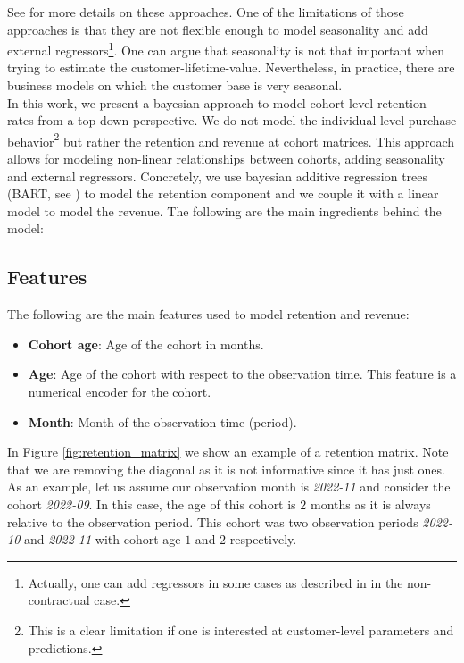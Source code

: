 \documentclass[11pt]{amsart}
\theoremstyle{definition}
\begin{document}
See \cite{FaderHardieNote2017} for more details on these approaches. One of the
limitations of those approaches is that they are not flexible enough to model
seasonality and add external regressors\footnote{Actually, one can add regressors in
some cases as described in \cite{FaderHardieNote2007} in the non-contractual case.}.
One can argue that seasonality is not that important when trying to estimate the
customer-lifetime-value. Nevertheless, in practice, there are business models on which
the customer base is very seasonal. \\

In this work, we present a bayesian approach to model cohort-level retention rates from
a top-down perspective. We do not model the individual-level purchase
behavior\footnote{This is a clear limitation if one is interested at customer-level
parameters and predictions.} but rather the retention and revenue at cohort matrices.
This approach allows for modeling non-linear relationships between cohorts, adding
seasonality and external regressors. Concretely, we use bayesian additive regression
trees (BART, see \cite{quiroga2022bart}) to model the retention component and we couple
it with a linear model to model the revenue. The following are the main ingredients 
behind the model:


\subsection*{Features}
The following are the main features used to model retention and revenue:
\begin{itemize}
    \item {\bf Cohort age}: Age of the cohort in months.
    \item {\bf Age}: Age of the cohort with respect to the observation time.
        This feature is a numerical encoder for the cohort.
    \item {\bf Month}: Month of the observation time (period).
\end{itemize}

In Figure \ref{fig:retention_matrix} we show an example of a retention matrix. Note
that we are removing the diagonal as it is not informative since it has just ones. As
an example, let us assume our observation month is {\em 2022-11} and consider the cohort
{\em 2022-09}. In this case, the age of this cohort is $2$ months as it is always
relative to the observation period. This cohort was two observation periods
{\em 2022-10} and {\em 2022-11} with cohort age $1$ and $2$ respectively.\\
\end{document}
